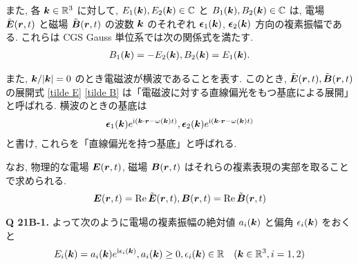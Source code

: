 \documentclass[a4paper,dvipdfmx]{jsarticle}
\theoremstyle{definition}
\begin{document}
また, 各 $\vb*{k}\in\mathbb{R}^3$ に対して, $E_1(\vb*{k}), E_2(\vb*{k})\in\mathbb{C}$ と $B_1(\vb*{k}), B_2(\vb*{k})\in\mathbb{C}$ は, 電場 $\tilde{\vb*{E}}(\vb*{r}, t)$ と磁場 $\tilde{\vb*{B}}(\vb*{r}, t)$ の波数 $\vb*{k}$ のそれぞれ $\vb*{\epsilon}_1(\vb*{k})$, $\vb*{\epsilon}_2(\vb*{k})$ 方向の複素振幅である. これらは CGS Gauss 単位系では次の関係式を満たす.
\begin{align}
  B_1(\vb*{k}) = -E_2(\vb*{k}), B_2(\vb*{k}) = E_1(\vb*{k}).
\end{align}

また, $\vb*{k}/|\vb*{k}| = 0$ のとき電磁波が横波であることを表す.
このとき, $\tilde{\vb*{E}}(\vb*{r}, t), \tilde{\vb*{B}}(\vb*{r}, t)$ の展開式 \eqref{tilde E} \eqref{tilde B} は「電磁波に対する直線偏光をもつ基底による展開」と呼ばれる. 横波のときの基底は
\begin{align}
  \vb*{\epsilon}_1(\vb*{k})e^{\mathrm{i}(\vb*{k}\cdot\vb*{r}-\omega(\vb*{k})t)}, \vb*{\epsilon}_2(\vb*{k})e^{\mathrm{i}(\vb*{k}\cdot\vb*{r}-\omega(\vb*{k})t)}
\end{align}
と書け, これらを「直線偏光を持つ基底」と呼ばれる.

なお, 物理的な電場 $\vb*{E}(\vb*{r}, t)$, 磁場 $\vb*{B}(\vb*{r}, t)$ はそれらの複素表現の実部を取ることで求められる.
\begin{align}
  \vb*{E}(\vb*{r}, t) = \Re\tilde{\vb*{E}}(\vb*{r}, t), \vb*{B}(\vb*{r}, t) = \Re\tilde{\vb*{B}}(\vb*{r}, t)
\end{align}

\textbf{Q 21B-1.} よって次のように電場の複素振幅の絶対値 $a_i(\vb*{k})$ と偏角 $\epsilon_i(\vb*{k})$ をおくと
\begin{align}
  E_i(\vb*{k}) = a_i(\vb*{k}) e^{\mathrm{i}\epsilon_i(\vb*{k})}, a_i(\vb*{k}) \geq 0, \epsilon_i(\vb*{k})\in\mathbb{R} \quad (\vb*{k}\in\mathbb{R}^3, i = 1, 2)
\end{align}
\end{document}
